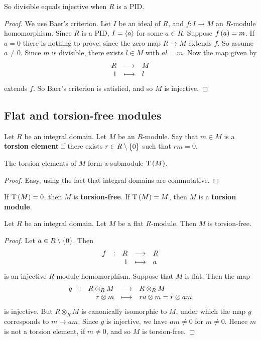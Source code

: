 So divisible equals injective when $ R $ is a PID.

\begin{proof}
We use Baer's criterion. Let $ I $ be an ideal of $ R $, and $ f : I \to M $ an $ R $-module homomorphism. Since $ R $ is a PID, $ I = \left\langle a \right\rangle $ for some $ a \in R $. Suppose $ f\br{a} = m $. If $ a = 0 $ there is nothing to prove, since the zero map $ R \to M $ extends $ f $. So assume $ a \ne 0 $. Since $ m $ is divisible, there exists $ l \in M $ with $ al = m $. Now the map given by
$$ \function{R}{M}{1}{l} $$
extends $ f $. So Baer's criterion is satisfied, and so $ M $ is injective.
\end{proof}

\subsection{Flat and torsion-free modules}

\begin{definition}
Let $ R $ be an integral domain. Let $ M $ be an $ R $-module. Say that $ m \in M $ is a \textbf{torsion element} if there exists $ r \in R \setminus \cbr{0} $ such that $ rm = 0 $.
\end{definition}

\begin{proposition}
The torsion elements of $ M $ form a submodule $ \T\br{M} $.
\end{proposition}

\begin{proof}
Easy, using the fact that integral domains are commutative.
\end{proof}

\begin{definition}
If $ \T\br{M} = 0 $, then $ M $ is \textbf{torsion-free}. If $ \T\br{M} = M $, then $ M $ is a \textbf{torsion module}.
\end{definition}

\begin{proposition}
Let $ R $ be an integral domain. Let $ M $ be a flat $ R $-module. Then $ M $ is torsion-free.
\end{proposition}

\begin{proof}
Let $ a \in R \setminus \cbr{0} $. Then
$$ \function[f]{R}{R}{1}{a} $$
is an injective $ R $-module homomorphism. Suppose that $ M $ is flat. Then the map
$$ \function[g]{R \otimes_R M}{R \otimes_R M}{r \otimes m}{ra \otimes m = r \otimes am} $$
is injective. But $ R \otimes_R M $ is canonically isomorphic to $ M $, under which the map $ g $ corresponds to $ m \mapsto am $. Since $ g $ is injective, we have $ am \ne 0 $ for $ m \ne 0 $. Hence $ m $ is not a torsion element, if $ m \ne 0 $, and so $ M $ is torsion-free.
\end{proof}

